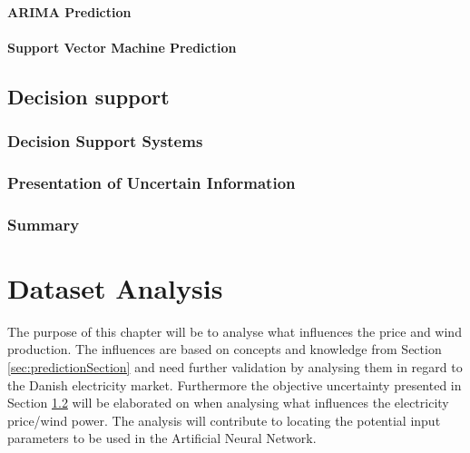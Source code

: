 \documentclass[twoside,11pt,openright]{report}
\begin{document}
\subsubsection{ARIMA Prediction}
 
\subsubsection{Support Vector Machine Prediction}
\label{sec:svmPrediction}



\newpage

\section{Decision support}
\label{sec:dssAndUncertain}
\subsection{Decision Support Systems}
\label{sec:dssSection}

\subsection{Presentation of Uncertain Information}
\label{sec:uncertainInformation}

\subsection{Summary}



\chapter{Dataset Analysis}
\label{ch:theANNs}
The purpose of this chapter will be to analyse what influences the price and wind production. The influences are based on concepts and knowledge from Section \ref{sec:predictionSection} and need further validation by analysing them in regard to the Danish electricity market. Furthermore the objective uncertainty presented in Section \ref{sec:uncertainInformation} will be elaborated on when analysing what influences the electricity price/wind power. The analysis will contribute to locating the potential input parameters to be used in the Artificial Neural Network.
\end{document}
